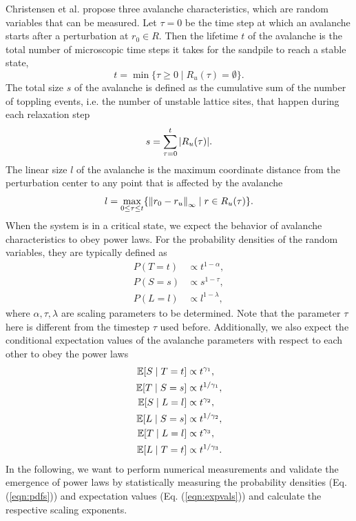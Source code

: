 Christensen et al. \cite{christensen1991dynamical} propose three avalanche characteristics, which are random variables that can be measured. Let $\tau=0$ be the time step at which an avalanche starts after a perturbation at $r_0\in R$. Then the lifetime $t$ of the avalanche is the total number of microscopic time steps it takes for the sandpile to reach a stable state,
\begin{equation}
    t = \min\{\tau\geq0 \mid R_u(\tau) = \emptyset\}.
\end{equation}
The total size $s$ of the avalanche is defined as the cumulative sum of the number of toppling events, i.e. the number of unstable lattice sites, that happen during each relaxation step
\begin{equation}
    s = \sum_{\tau=0}^t \abs{R_u(\tau)}.
\end{equation}
The linear size $l$ of the avalanche is the maximum coordinate distance from the perturbation center to any point that is affected by the avalanche
\begin{equation}
    l = \max_{0\leq\tau\leq t}\{\norm{r_0-r_u}_\infty \mid r\in R_u(\tau)\}.
\end{equation}
When the system is in a critical state, we expect the behavior of avalanche characteristics to obey power laws. For the probability densities of the random variables, they are typically defined as
\begin{align}
    P(T=t) &\propto t^{1-\alpha}, \nonumber \\
    P(S=s) &\propto s^{1-\tau}, \label{eqn:pdfs} \\
    P(L=l) &\propto l^{1-\lambda}, \nonumber
\end{align}
where $\alpha,\tau,\lambda$ are scaling parameters to be determined. Note that the parameter $\tau$ here is different from the timestep $\tau$ used before. Additionally, we also expect the conditional expectation values of the avalanche parameters with respect to each other to obey the power laws
\begin{align}
    \mathbb{E}[S \mid T=t] &\propto t^{\gamma_1}, \nonumber \\
    \mathbb{E}[T \mid S=s] &\propto t^{1/\gamma_1}, \nonumber \\
    \mathbb{E}[S \mid L=l] &\propto t^{\gamma_2}, \nonumber \\
    \mathbb{E}[L \mid S=s] &\propto t^{1/\gamma_2}, \label{eqn:expvals} \\
    \mathbb{E}[T \mid L=l] &\propto t^{\gamma_3}, \nonumber \\
    \mathbb{E}[L \mid T=t] &\propto t^{1/\gamma_3}. \nonumber
\end{align}
In the following, we want to perform numerical measurements and validate the emergence of power laws by statistically measuring the probability densities (Eq. (\ref{eqn:pdfs})) and expectation values (Eq. (\ref{eqn:expvals})) and calculate the respective scaling exponents.
